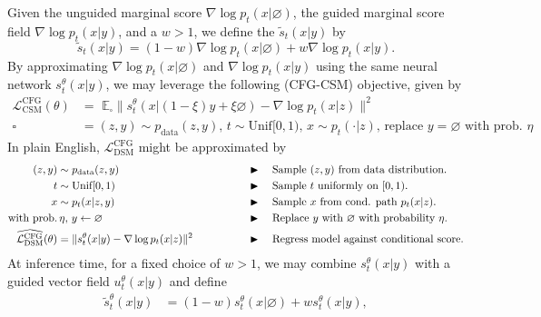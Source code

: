 \begin{summarybox}
Given the unguided marginal score $\nabla \log p_t(x|\varnothing)$, the guided marginal score field $\nabla \log p_t(x|y)$, and a  $w > 1$, we define the  $\tilde{s}_t(x|y)$ by 
\begin{equation}
    \tilde{s}_t(x|y) = (1-w) \nabla \log p_t(x|\varnothing) + w \nabla \log p_t(x|y).
    \label{eq:flow_cfg}
\end{equation}
By approximating $\nabla \log p_t(x|\varnothing)$ and $\nabla \log p_t(x|y)$ using the same neural network $s_t^\theta(x|y)$, we may leverage the following  (CFG-CSM) objective, given by
\begin{align}
    \label{eq:cfg_guided_dsm}
    \mathcal{L}_{\text{CSM}}^{\text{CFG}}(\theta) &= \,\,\mathbb{E}_{\square} \lVert s_t^{\theta}(x|(1-\xi)y + \xi \varnothing) - \nabla \log p_t(x|z)\rVert^2\\
    \square &= (z,y) \sim p_{\text{data}}(z,y),\, t \sim \text{Unif}[0,1),\, x \sim p_t(\cdot|z),\,\text{replace }y=\varnothing\text{ with prob. }\eta
\end{align}
In plain English, $\mathcal{L}_{\text{DSM}}^{\text{CFG}}$ might be approximated by
\begin{alignat*}{3}
    (z,y) &\sim p_{\rm{data}}(z,y) \quad\quad\quad\quad && \blacktriangleright \quad \text{Sample $(z,y)$ from data distribution.}\\
    t &\sim \text{Unif}[0,1) \quad\quad\quad\quad && \blacktriangleright \quad \text{Sample $t$ uniformly on $[0,1)$.}\\
    x &\sim p_t(x|z,y) \quad\quad\quad\quad && \blacktriangleright \quad \text{Sample $x$ from cond. path $p_t(x|z)$.}\\
    \text{with prob.}&\,\eta,\, y \gets \varnothing \quad\quad\quad\quad && \blacktriangleright \quad \text{Replace $y$ with $\varnothing$ with probability $\eta$.}\\
    \widehat{\mathcal{L}_{\text{DSM}}^{\text{CFG}}}(\theta) &=  \lVert s_t^{\theta}(x|y) - \nabla \log p_t(x|z)\rVert^2 \quad\quad\quad\quad && \blacktriangleright \quad \text{Regress model against conditional score.}
\end{alignat*}
At inference time, for a fixed choice of $w > 1$, we may combine $s_t^\theta(x|y)$ with a guided vector field $u_t^\theta(x|y)$ and define
\begin{align*}
    \tilde{s}^\theta_t(x|y) &= (1-w) s_t^\theta(x|\varnothing) + w s_t^\theta(x|y),\\

\end{align*}
\end{summarybox}
